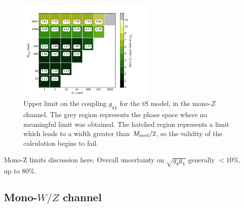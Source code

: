 \begin{figure}[h]
  \centering
    \includegraphics[width=0.6\textwidth]{figures/grid_allpoints_TSD_rat1.png}
    \caption{Upper limit on the coupling $g_{q \chi}$ for the tS model, in the mono-$Z$ channel. The grey region represents the phase space where no meaningful limit was obtained. The hatched region represents a limit which leads to a width greater than $M_{\mathrm{med}} / 2$, so the validity of the calculation begins to fail.}
    \label{fig:MonoZ_TSD_couplinglimit}
\end{figure}

Mono-Z limits discussion here. Overall uncertainty on $\sqrt{g_q g_{\chi}}$ generally $ < 10\%$, up to 80$\%$.

\subsection{Mono-$W/Z$ channel}

